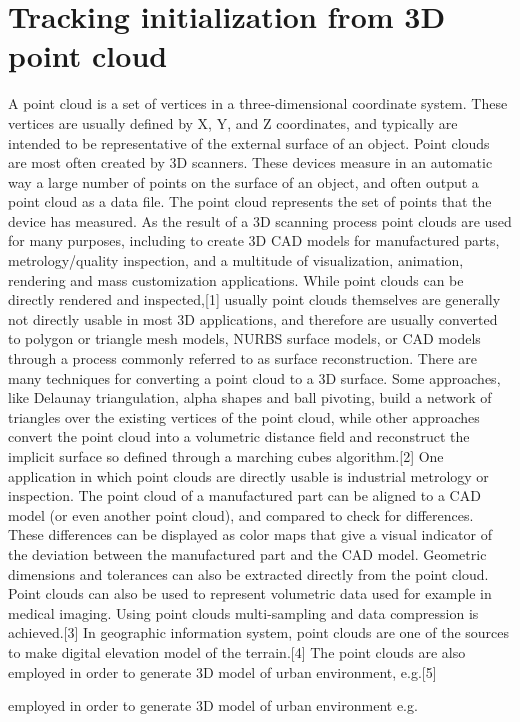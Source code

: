 \section{Tracking initialization from 3D point cloud}
\label{sec:tifpc}
A point cloud is a set of vertices in a three-dimensional coordinate system. These vertices are usually defined by X, Y, and Z coordinates, and typically are intended to be representative of the external surface of an object.
Point clouds are most often created by 3D scanners. These devices measure in an automatic way a large number of points on the surface of an object, and often output a point cloud as a data file. The point cloud represents the set of points that the device has measured.
As the result of a 3D scanning process point clouds are used for many purposes, including to create 3D CAD models for manufactured parts, metrology/quality inspection, and a multitude of visualization, animation, rendering and mass customization applications.
While point clouds can be directly rendered and inspected,[1] usually point clouds themselves are generally not directly usable in most 3D applications, and therefore are usually converted to polygon or triangle mesh models, NURBS surface models, or CAD models through a process commonly referred to as surface reconstruction. There are many techniques for converting a point cloud to a 3D surface. Some approaches, like Delaunay triangulation, alpha shapes and ball pivoting, build a network of triangles over the existing vertices of the point cloud, while other approaches convert the point cloud into a volumetric distance field and reconstruct the implicit surface so defined through a marching cubes algorithm.[2]
One application in which point clouds are directly usable is industrial metrology or inspection. The point cloud of a manufactured part can be aligned to a CAD model (or even another point cloud), and compared to check for differences. These differences can be displayed as color maps that give a visual indicator of the deviation between the manufactured part and the CAD model. Geometric dimensions and tolerances can also be extracted directly from the point cloud.
Point clouds can also be used to represent volumetric data used for example in medical imaging. Using point clouds multi-sampling and data compression is achieved.[3]
In geographic information system, point clouds are one of the sources
to make digital elevation model of the terrain.[4] The point clouds
are also employed in order to generate 3D model of urban environment,
e.g.[5]

employed in order to generate 3D model of urban environment e.g.
